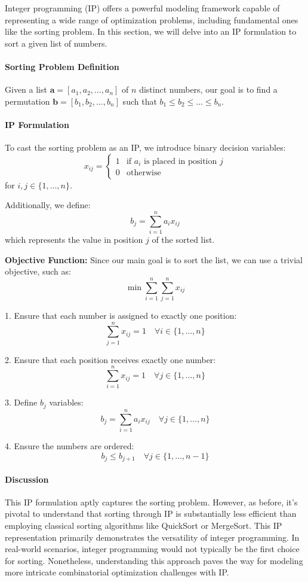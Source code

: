 Integer programming (IP) offers a powerful modeling framework capable of representing a wide range of optimization problems, including fundamental ones like the sorting problem. In this section, we will delve into an IP formulation to sort a given list of numbers.

\paragraph{Sorting Problem Definition}
Given a list \( \mathbf{a} = [a_1, a_2, \ldots, a_n] \) of \( n \) distinct numbers, our goal is to find a permutation \( \mathbf{b} = [b_1, b_2, \ldots, b_n] \) such that \( b_1 \leq b_2 \leq \ldots \leq b_n \).

\paragraph{IP Formulation}
To cast the sorting problem as an IP, we introduce binary decision variables:
\[ x_{ij} = 
\begin{cases} 
1 & \text{if } a_i \text{ is placed in position } j \\
0 & \text{otherwise} 
\end{cases}
\]
for \( i, j \in \{1, \ldots, n\} \).

Additionally, we define:
\[ b_j = \sum_{i=1}^{n} a_i x_{ij} \]
which represents the value in position \( j \) of the sorted list.

\textbf{Objective Function:} Since our main goal is to sort the list, we can use a trivial objective, such as:
\[ \min \sum_{i=1}^{n} \sum_{j=1}^{n} x_{ij} \]


1. Ensure that each number is assigned to exactly one position:
\[ \sum_{j=1}^{n} x_{ij} = 1 \quad \forall i \in \{1, \ldots, n\} \]

2. Ensure that each position receives exactly one number:
\[ \sum_{i=1}^{n} x_{ij} = 1 \quad \forall j \in \{1, \ldots, n\} \]

3. Define \( b_j \) variables:
\[ b_j = \sum_{i=1}^{n} a_i x_{ij} \quad \forall j \in \{1, \ldots, n\} \]

4. Ensure the numbers are ordered:
\[ b_j \leq b_{j+1} \quad \forall j \in \{1, \ldots, n-1\} \]

\paragraph{Discussion}
This IP formulation aptly captures the sorting problem. However, as before, it's pivotal to understand that sorting through IP is substantially less efficient than employing classical sorting algorithms like QuickSort or MergeSort. This IP representation primarily demonstrates the versatility of integer programming. In real-world scenarios, integer programming would not typically be the first choice for sorting. Nonetheless, understanding this approach paves the way for modeling more intricate combinatorial optimization challenges with IP.

